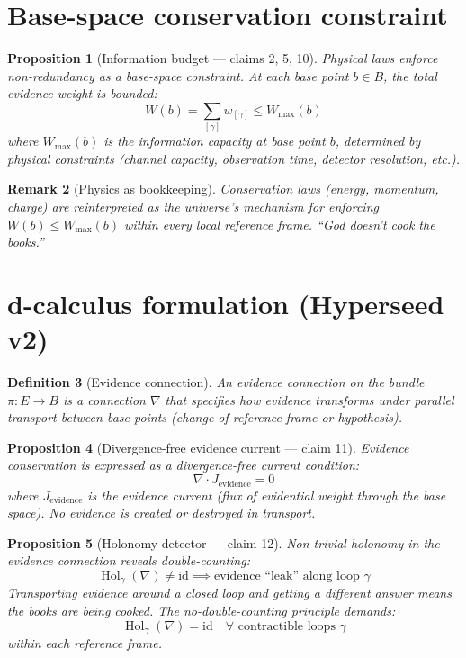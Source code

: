 \documentclass[11pt,a4paper]{article}
\newtheorem{definition}{Definition}[section]
\newtheorem{proposition}[definition]{Proposition}
\newtheorem{remark}[definition]{Remark}
\begin{document}
\section{Base-space conservation constraint}

\begin{proposition}[Information budget --- claims 2, 5, 10]
\label{prop:budget}
Physical laws enforce non-redundancy as a base-space constraint.
At each base point $b \in B$, the total evidence weight is bounded:
\[
  W(b) = \sum_{[\gamma]} w_{[\gamma]} \leq W_{\max}(b)
\]
where $W_{\max}(b)$ is the information capacity at base point $b$,
determined by physical constraints (channel capacity, observation
time, detector resolution, etc.).
\end{proposition}

\begin{remark}[Physics as bookkeeping]
Conservation laws (energy, momentum, charge) are reinterpreted as
the universe's mechanism for enforcing $W(b) \leq W_{\max}(b)$
within every local reference frame. ``God doesn't cook the books.''
\end{remark}

\section{d-calculus formulation (Hyperseed v2)}

\begin{definition}[Evidence connection]
An \emph{evidence connection} on the bundle $\pi : E \to B$ is a
connection $\nabla$ that specifies how evidence transforms under
parallel transport between base points (change of reference frame
or hypothesis).
\end{definition}

\begin{proposition}[Divergence-free evidence current --- claim 11]
\label{prop:divfree}
Evidence conservation is expressed as a divergence-free current
condition:
\[
  \nabla \cdot J_{\text{evidence}} = 0
\]
where $J_{\text{evidence}}$ is the evidence current (flux of
evidential weight through the base space). No evidence is
created or destroyed in transport.
\end{proposition}

\begin{proposition}[Holonomy detector --- claim 12]
\label{prop:holonomy}
Non-trivial holonomy in the evidence connection reveals
double-counting:
\[
  \operatorname{Hol}_\gamma(\nabla) \neq \mathrm{id}
  \implies \text{evidence ``leak'' along loop } \gamma
\]
Transporting evidence around a closed loop and getting a different
answer means the books are being cooked. The no-double-counting
principle demands:
\[
  \operatorname{Hol}_\gamma(\nabla) = \mathrm{id}
  \quad \forall \text{ contractible loops } \gamma
\]
within each reference frame.
\end{proposition}
\end{document}
